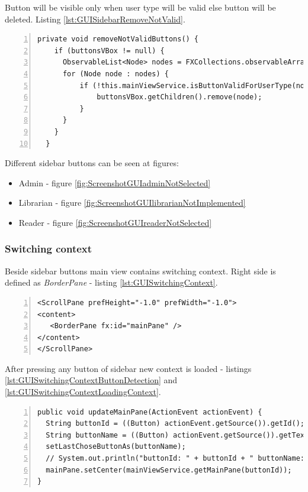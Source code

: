 Button will be visible only when user type will be valid else button will be deleted. Listing \ref{lst:GUISidebarRemoveNotValid}.

\begin{lstlisting}[breaklines=true, numbers=left, stepnumber=1, label={lst:GUISidebarRemoveNotValid}, caption={Remove sidebar buttons not allowed for user types}]
  private void removeNotValidButtons() {
    if (buttonsVBox != null) {
      ObservableList<Node> nodes = FXCollections.observableArrayList(buttonsVBox.getChildren());
      for (Node node : nodes) {
          if (!this.mainViewService.isButtonValidForUserType(node.idProperty().get())) {
              buttonsVBox.getChildren().remove(node);
          }
      }
    }
  }
\end{lstlisting}

Different sidebar buttons can be seen at figures:
\begin{itemize}
  \item Admin - figure \ref{fig:ScreenshotGUIadminNotSelected}
  \item Librarian - figure \ref{fig:ScreenshotGUIlibrarianNotImplemented}
  \item Reader - figure \ref{fig:ScreenshotGUIreaderNotSelected}
\end{itemize} 

\subsubsection{Switching context}
Beside sidebar buttons main view contains switching context. Right side is defined as \textit{BorderPane} - listing \ref{lst:GUISwitchingContext}.

\begin{lstlisting}[breaklines=true, numbers=left, stepnumber=1, label={lst:GUISwitchingContext}, caption={Switching context of main view - FXML}]
<ScrollPane prefHeight="-1.0" prefWidth="-1.0">
<content>
   <BorderPane fx:id="mainPane" />
</content>
</ScrollPane>
\end{lstlisting}

After pressing any button of sidebar new context is loaded - listings \ref{lst:GUISwitchingContextButtonDetection} and \ref{lst:GUISwitchingContextLoadingContext}.

\begin{lstlisting}[breaklines=true, numbers=left, stepnumber=1, label={lst:GUISwitchingContextButtonDetection}, caption={Switching context - button detection}]
public void updateMainPane(ActionEvent actionEvent) {
  String buttonId = ((Button) actionEvent.getSource()).getId();
  String buttonName = ((Button) actionEvent.getSource()).getText();
  setLastChoseButtonAs(buttonName);
  // System.out.println("buttonId: " + buttonId + " buttonName: " + buttonName);
  mainPane.setCenter(mainViewService.getMainPane(buttonId));
}
\end{lstlisting}

